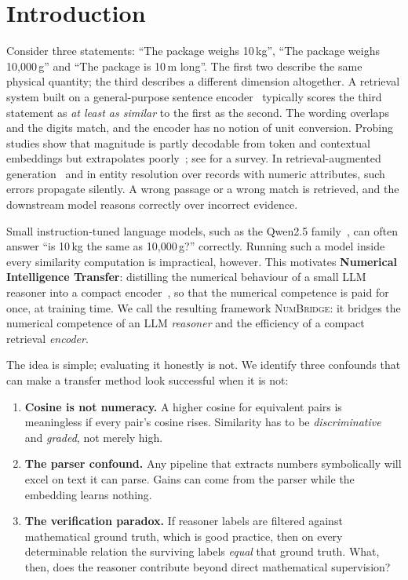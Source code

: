\documentclass[11pt]{article}
\newcommand{\method}{\textup{\textsc{NumBridge}}\xspace}
\begin{document}
\section{Introduction}
Consider three statements: ``The package weighs 10\,kg'', ``The package weighs 10{,}000\,g'' and ``The package is
10\,m long''. The first two describe the same physical quantity; the third describes a different dimension altogether.
A retrieval system built on a general-purpose sentence encoder~\cite{reimers2019sbert} typically scores the third
statement as \emph{at least as similar} to the first as the second. The wording overlaps and the digits match, and the
encoder has no notion of unit conversion. Probing studies show that magnitude is partly decodable from token and
contextual embeddings but extrapolates poorly~\cite{naik2019numeracy,wallace2019numbers,zhang2020scales}; see
\citet{thawani2021survey} for a survey. In retrieval-augmented generation~\cite{lewis2020rag} and in entity
resolution over records with numeric attributes, such errors propagate silently. A wrong passage or a wrong match is
retrieved, and the downstream model reasons correctly over incorrect evidence.

Small instruction-tuned language models, such as the Qwen2.5 family~\cite{qwen2025qwen25}, can often answer ``is
10\,kg the same as 10{,}000\,g?'' correctly. Running such a model inside every similarity computation is impractical,
however. This motivates \textbf{Numerical Intelligence Transfer}: distilling the numerical behaviour of a small LLM
reasoner into a compact encoder~\cite{hinton2015distilling,reimers2020multilingual}, so that the numerical
competence is paid for once, at training time. We call the resulting framework \method: it bridges the numerical competence of an LLM \emph{reasoner} and the efficiency of a compact retrieval \emph{encoder}.

The idea is simple; evaluating it honestly is not. We identify three confounds that can make a transfer method look
successful when it is not:
\begin{enumerate}[leftmargin=*,itemsep=2pt]
\item \textbf{Cosine is not numeracy.} A higher cosine for equivalent pairs is meaningless if every pair's cosine
rises. Similarity has to be \emph{discriminative} and \emph{graded}, not merely high.
\item \textbf{The parser confound.} Any pipeline that extracts numbers symbolically will excel on text it can parse.
Gains can come from the parser while the embedding learns nothing.
\item \textbf{The verification paradox.} If reasoner labels are filtered against mathematical ground truth, which is
good practice, then on every determinable relation the surviving labels \emph{equal} that ground truth. What, then,
does the reasoner contribute beyond direct mathematical supervision?
\end{enumerate}
\end{document}
